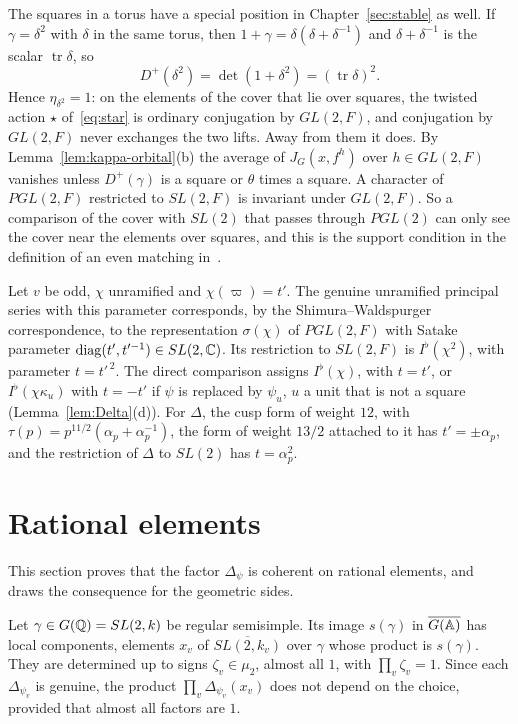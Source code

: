 The squares in a torus have a special position in
Chapter~\ref{sec:stable} as well. If $\gamma=\delta^2$ with $\delta$ in
the same torus, then $1+\gamma=\delta(\delta+\delta^{-1})$ and
$\delta+\delta^{-1}$ is the scalar $\operatorname{tr}\delta$, so
\begin{equation}\label{eq:square-Dplus}
D^+(\delta^2)=\det(1+\delta^2)=(\operatorname{tr}\delta)^2 .
\end{equation}
Hence $\eta_{\delta^2}=1$: on the elements of the cover that lie over
squares, the twisted action $\star$ of~\eqref{eq:star} is ordinary
conjugation by $GL(2,F)$, and conjugation by $GL(2,F)$ never exchanges
the two lifts. Away from them it does. By
Lemma~\ref{lem:kappa-orbital}(b) the average of $J_G(x,f^h)$ over
$h\in GL(2,F)$ vanishes unless $D^+(\gamma)$ is a square or $\theta$
times a square. A character of $PGL(2,F)$ restricted to $SL(2,F)$ is
invariant under $GL(2,F)$. So a comparison of the cover with $SL(2)$
that passes through $PGL(2)$ can only see the cover near the elements
over squares, and this is the support condition in the definition of an
even matching in~\cite{JC26}.

\begin{example}\label{ex:wrong-orbit}
Let $v$ be odd, $\chi$ unramified and $\chi(\varpi)=t'$. The genuine
unramified principal series with this parameter corresponds, by the
Shimura--Waldspurger correspondence, to the representation $\sigma(\chi)$
of $PGL(2,F)$ with Satake parameter $\operatorname{diag}(t',t'^{-1})\in SL(2,\mathbb{C})$. Its
restriction to $SL(2,F)$ is $I^\flat(\chi^2)$, with parameter $t=t'^{\,2}$.
The direct comparison assigns $I^\flat(\chi)$, with $t=t'$, or
$I^\flat(\chi\kappa_u)$ with $t=-t'$ if $\psi$ is replaced by $\psi_u$, $u$
a unit that is not a square (Lemma~\ref{lem:Delta}(d)). For
$\Delta$, the cusp form of weight $12$, with $\tau(p)=p^{11/2}(\alpha_p+
\alpha_p^{-1})$, the form of weight $13/2$ attached to it has
$t'=\pm\alpha_p$, and the restriction of $\Delta$ to $SL(2)$ has
$t=\alpha_p^2$.
\end{example}

\section{Rational elements}\label{sec:compare-rational}

This section proves that the factor $\Delta_\psi$ is coherent on
rational elements, and draws the consequence for the geometric sides.

Let $\gamma\in G(\mathbb{Q})=SL(2,k)$ be regular semisimple. Its image
$s(\gamma)$ in $\overline{G(\mathbb{A})}$ has local components, elements $x_v$ of
$\overline{SL(2,k_v)}$ over $\gamma$ whose product is $s(\gamma)$. They
are determined up to signs $\zeta_v\in\mu_2$, almost all $1$, with
$\prod_v\zeta_v=1$. Since each $\Delta_{\psi_v}$ is genuine, the product
$\prod_v\Delta_{\psi_v}(x_v)$ does not depend on the choice, provided
that almost all factors are $1$.

